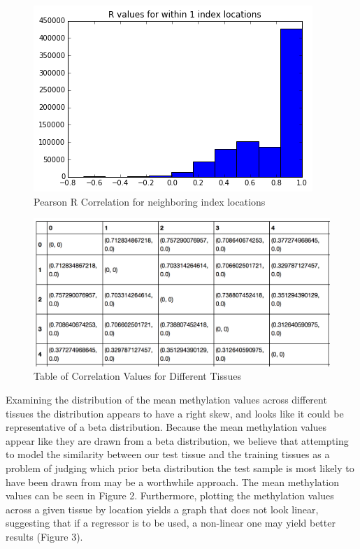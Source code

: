 \documentclass{article} %
\begin{document}
\begin{figure}[!ht]
\begin{center}
\caption{Pearson R Correlation for neighboring index locations}
\begin{minipage}[b]{0.40\linewidth}
	\includegraphics[scale=0.40]{CorrelationByLocation.png}
\end{minipage}
\quad
\end{center}
\end{figure}

\begin{figure}[!ht]
\begin{center}
\caption{Table of Correlation Values for Different Tissues}
\begin{minipage}[b]{0.40\linewidth}
	\includegraphics[scale=0.3]{table1.png}
\end{minipage}
\end{center}
\end{figure}

Examining the distribution of the mean methylation values across different tissues the distribution appears to have a right skew, and looks like it could be representative of a beta distribution. Because the mean methylation values appear like they are drawn from a beta distribution, we believe that attempting to model the similarity between our test tissue and the training tissues as a problem of judging which prior beta distribution the test sample is most likely to have been drawn from may be a worthwhile approach. The mean methylation values can be seen in Figure 2. Furthermore, plotting the methylation values across a given tissue by location yields a graph that does not look linear, suggesting that if a regressor is to be used, a non-linear one may yield better results (Figure 3).
\end{document}
